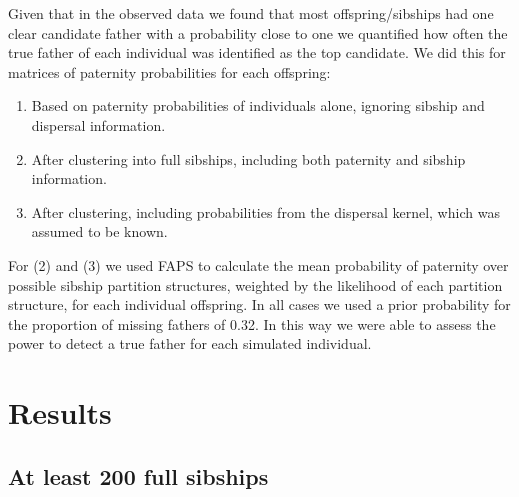 \documentclass[10pt, a4paper, twocolumn]{article} %
\begin{document}
Given that in the observed data we found that most offspring/sibships had one clear candidate father with a probability close to one we quantified how often the true father of each individual was identified as the top candidate. We did this for matrices of paternity probabilities for each offspring:
\begin{enumerate}
\item Based on paternity probabilities of individuals alone, ignoring sibship and dispersal information.
\item After clustering into full sibships, including both paternity and sibship information.
\item After clustering, including probabilities from the dispersal kernel, which was assumed to be known.
\end{enumerate}
For (2) and (3) we used FAPS to calculate the mean probability of paternity over possible sibship partition structures, weighted by the likelihood of each partition structure, for each individual offspring. In all cases we used a prior probability for the proportion of missing fathers of 0.32. In this way we were able to assess the power to detect a true father for each simulated individual.

\section{Results}

\subsection{At least 200 full sibships}
\end{document}

